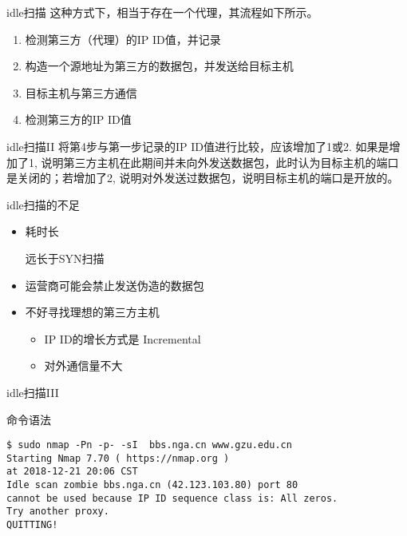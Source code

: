 \documentclass{beamer}
\begin{document}
\begin{frame}[fragile]{idle扫描}
这种方式下，相当于存在一个代理，其流程如下所示。
\begin{enumerate}
\item
检测第三方（代理）的IP ID值，并记录
\item
构造一个源地址为第三方的数据包，并发送给目标主机
\item
目标主机与第三方通信
\item
检测第三方的IP ID值
\end{enumerate}



\end{frame}
\begin{frame}{idle扫描II}
将第4步与第一步记录的IP ID值进行比较，应该增加了1或2. 如果是增加了1, 说明第三方主机在此期间并未向外发送数据包，此时认为目标主机的端口是关闭的；若增加了2, 说明对外发送过数据包，说明目标主机的端口是开放的。
\begin{block}{idle扫描的不足}
\begin{itemize}
\item
耗时长

远长于SYN扫描
\item
运营商可能会禁止发送伪造的数据包
\item
不好寻找理想的第三方主机
\begin{itemize}
\item
IP ID的增长方式是 Incremental
\item
对外通信量不大
\end{itemize}
\end{itemize}
\end{block}
\end{frame}
\begin{frame}[fragile]{idle扫描III}
\begin{block}{命令语法}
\begin{verbatim}
$ sudo nmap -Pn -p- -sI  bbs.nga.cn www.gzu.edu.cn
Starting Nmap 7.70 ( https://nmap.org ) 
at 2018-12-21 20:06 CST
Idle scan zombie bbs.nga.cn (42.123.103.80) port 80 
cannot be used because IP ID sequence class is: All zeros.  
Try another proxy.
QUITTING!

\end{verbatim}
\end{block}
\end{frame}
\end{document}
